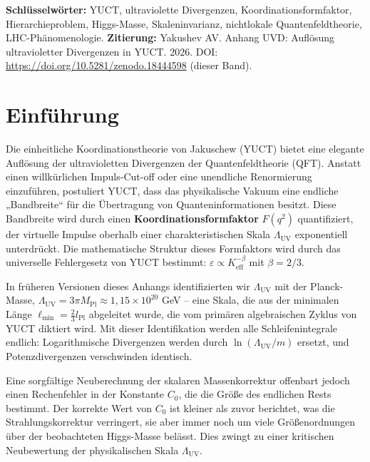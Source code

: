 \documentclass[11pt,a4paper]{article}
\newcommand{\Mpl}{M_{\mathrm{Pl}}}
\newcommand{\Lpl}{l_{\mathrm{Pl}}}
\newcommand{\Lmin}{\ell_{\min}}
\newcommand{\LUV}{\Lambda_{\mathrm{UV}}}
\theoremstyle{remark}
\begin{document}
	\vspace{0.2cm}
	\noindent
	{\color{darkblue}\textbf{Schlüsselwörter:}} YUCT, ultraviolette Divergenzen, Koordinationsformfaktor, Hierarchieproblem, Higgs-Masse, Skaleninvarianz, nichtlokale Quantenfeldtheorie, LHC-Phänomenologie.
	\vspace{0.1cm}
	\noindent
	{\color{darkblue}\textbf{Zitierung:}} Yakushev AV. Anhang UVD: Auflösung ultravioletter Divergenzen in YUCT. 2026. DOI: \url{https://doi.org/10.5281/zenodo.18444598} (dieser Band).
	
	\vspace{0.5cm}
	
	\section{Einführung}
	\label{sec:intro}
	
	Die einheitliche Koordinationstheorie von Jakuschew (YUCT) bietet eine elegante Auflösung der ultravioletten Divergenzen der Quantenfeldtheorie (QFT). Anstatt einen willkürlichen Impuls-Cut-off oder eine unendliche Renormierung einzuführen, postuliert YUCT, dass das physikalische Vakuum eine endliche „Bandbreite“ für die Übertragung von Quanteninformationen besitzt. Diese Bandbreite wird durch einen \textbf{Koordinationsformfaktor} \(F(q^2)\) quantifiziert, der virtuelle Impulse oberhalb einer charakteristischen Skala \(\LUV\) exponentiell unterdrückt. Die mathematische Struktur dieses Formfaktors wird durch das universelle Fehlergesetz von YUCT bestimmt: \(\varepsilon \propto K_{\mathrm{eff}}^{-\beta}\) mit \(\beta = 2/3\).
	
	In früheren Versionen dieses Anhangs identifizierten wir \(\LUV\) mit der Planck-Masse, \(\LUV = 3\pi\Mpl \approx 1,15\times 10^{20}\) GeV – eine Skala, die aus der minimalen Länge \(\Lmin = \frac{2}{3}\Lpl\) abgeleitet wurde, die vom primären algebraischen Zyklus von YUCT diktiert wird. Mit dieser Identifikation werden alle Schleifenintegrale endlich: Logarithmische Divergenzen werden durch \(\ln(\LUV/m)\) ersetzt, und Potenzdivergenzen verschwinden identisch.
	
	Eine sorgfältige Neuberechnung der skalaren Massenkorrektur offenbart jedoch einen Rechenfehler in der Konstante \(C_0\), die die Größe des endlichen Rests bestimmt. Der korrekte Wert von \(C_0\) ist kleiner als zuvor berichtet, was die Strahlungskorrektur verringert, sie aber immer noch um viele Größenordnungen über der beobachteten Higgs-Masse belässt. Dies zwingt zu einer kritischen Neubewertung der physikalischen Skala \(\LUV\).
	
\end{document}
